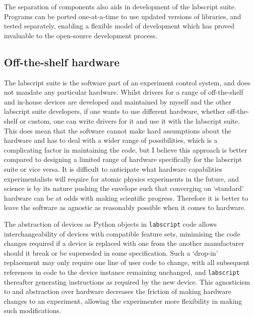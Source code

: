 The separation of components also aids in development of the labscript suite. Programs can be ported one-at-a-time to use updated versions of libraries, and tested separately, enabling a flexible model of development which has proved invaluable to the open-source development process. 


\subsection{Off-the-shelf hardware}

The labscript suite is the software part of an experiment control system, and does not mandate any particular hardware. Whilst drivers for a range of off-the-shelf and in-house devices are developed and maintained by myself and the other labscript suite developers, if one wants to use different hardware, whether off-the-shelf or custom, one can write drivers for it and use it with the labscript suite. This does mean that the software cannot make hard assumptions about the hardware and has to deal with a wider range of possibilities, which is a complicating factor in maintaining the code, but I believe this approach is better compared to designing a limited range of hardware specifically for the labscript suite or vice versa. It is difficult to anticipate what hardware capabilities experimentalists will require for atomic physics experiments in the future, and science is by its nature pushing the envelope such that converging on `standard' hardware can be at odds with making scientific progress. Therefore it is better to leave the software as agnostic as reasonably possible when it comes to hardware.

The abstraction of devices as Python objects in \texttt{labscript} code allows interchangeability of devices with compatible feature sets, minimising the code changes required if a device is replaced with one from the another manufacturer should it break or be superseded in some specification. Such a `drop-in' replacement may only require one line of user code to change, with all subsequent references in code to the device instance remaining unchanged, and \texttt{labscript} thereafter generating instructions as required by the new device. This agnosticism to and abstraction over hardware decreases the friction of making hardware changes to an experiment, allowing the experimenter more flexibility in making such modifications.

